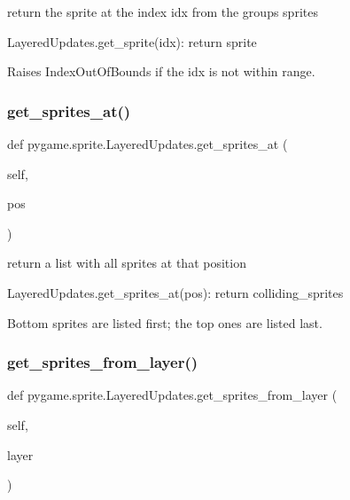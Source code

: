 \begin{DoxyVerb}return the sprite at the index idx from the groups sprites

LayeredUpdates.get_sprite(idx): return sprite

Raises IndexOutOfBounds if the idx is not within range.\end{DoxyVerb}
 \mbox{\label{classpygame_1_1sprite_1_1_layered_updates_afbbf762f942018fb1eee8d42df5c4124}} 
\subsubsection{\texorpdfstring{get\+\_\+sprites\+\_\+at()}{get\_sprites\_at()}}
{\footnotesize\ttfamily def pygame.\+sprite.\+Layered\+Updates.\+get\+\_\+sprites\+\_\+at (\begin{DoxyParamCaption}\item[{}]{self,  }\item[{}]{pos }\end{DoxyParamCaption})}

\begin{DoxyVerb}return a list with all sprites at that position

LayeredUpdates.get_sprites_at(pos): return colliding_sprites

Bottom sprites are listed first; the top ones are listed last.\end{DoxyVerb}
 \mbox{\label{classpygame_1_1sprite_1_1_layered_updates_ae9b67ca3a02b00f64c4efd5a708d9c19}} 
\subsubsection{\texorpdfstring{get\+\_\+sprites\+\_\+from\+\_\+layer()}{get\_sprites\_from\_layer()}}
{\footnotesize\ttfamily def pygame.\+sprite.\+Layered\+Updates.\+get\+\_\+sprites\+\_\+from\+\_\+layer (\begin{DoxyParamCaption}\item[{}]{self,  }\item[{}]{layer }\end{DoxyParamCaption})}

